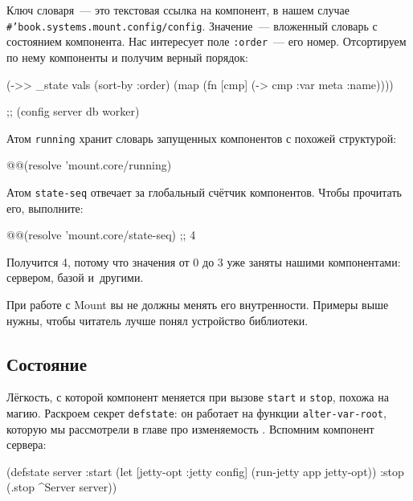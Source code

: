 \mnoindent Ключ словаря~--- это текстовая ссылка на компонент, в нашем случае
\texttt{\#'book.systems.mount\-.config/config}. Значение~--- вложенный словарь с
состоянием компонента. Нас интересует поле \verb|:order|~--- его
номер. Отсортируем по нему компоненты и получим верный порядок:

\begin{english}
  \begin{clojure}
(->> _state
     vals
     (sort-by :order)
     (map (fn [cmp]
            (-> cmp :var meta :name))))

;; (config server db worker)
  \end{clojure}
\end{english}

Атом \verb|running| хранит словарь запущенных компонентов с похожей структурой:

\begin{english}
  \begin{clojure}
@@(resolve 'mount.core/running)
  \end{clojure}
\end{english}

Атом \verb|state-seq| отвечает за глобальный счётчик компонентов. Чтобы
прочитать его, выполните:

\begin{english}
  \begin{clojure}
@@(resolve 'mount.core/state-seq) ;; 4
  \end{clojure}
\end{english}

\noindent
Получится 4, потому что значения от 0 до 3 уже заняты нашими компонентами:
сервером, базой и~другими.

При работе с Mount вы не должны менять его внутренности. Примеры выше нужны,
чтобы читатель лучше понял устройство библиотеки.

\subsection{Состояние}


Лёгкость, с которой компонент меняется при вызове \verb|start| и
\verb|stop|, похожа на магию. Раскроем секрет \verb|defstate|: он работает на
функции \verb|alter-var-root|, которую мы рассмотрели в главе про
изменяемость . Вспомним компонент сервера:

\begin{english}
  \begin{clojure}
(defstate server
  :start
  (let [{jetty-opt :jetty} config]
    (run-jetty app jetty-opt))
  :stop
  (.stop ^Server server))
  \end{clojure}
\end{english}

